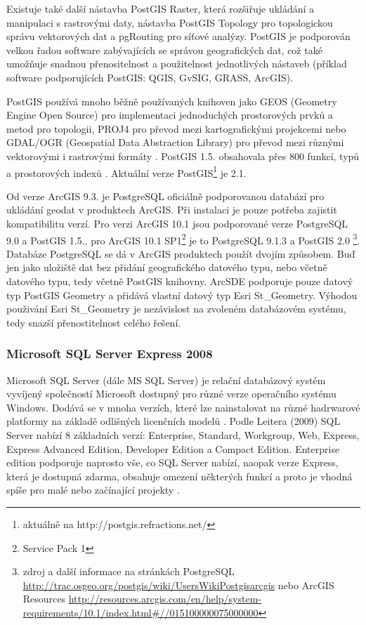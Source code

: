 Existuje také další nástavba PostGIS Raster, která rozšiřuje ukládání a manipulaci s rastrovými daty, nástavba PostGIS Topology pro topologickou správu vektorových dat a pgRouting pro síťové analýzy. PostGIS je podporován velkou řadou software zabývajících se správou geografických dat, což také umožňuje snadnou přenositelnost a použitelnost jednotlivých nástaveb (příklad software podporujících PostGIS: QGIS, GvSIG, GRASS, ArcGIS).

PostGIS používá mnoho běžně používaných knihoven jako GEOS (Geometry Engine Open Source) pro implementaci jednoduchých prostorových prvků a metod pro topologii, PROJ4 pro převod mezi kartografickými projekcemi nebo GDAL/OGR (Geospatial Data Abstraction Library) pro převod mezi různými vektorovými i rastrovými formáty \citep{ObeHsu2011}. PostGIS 1.5. obsahovala přes 800 funkcí, typů a prostorových indexů \citep{ObeHsu2012}. Aktuální verze PostGIS\footnote{aktuálně na http://postgis.refractions.net/} je 2.1.

Od verze ArcGIS 9.3. je PostgreSQL oficiálně podporovanou databází pro ukládání geodat v produktech ArcGIS. Při instalaci je pouze potřeba zajistit kompatibilitu verzí. Pro verzi ArcGIS 10.1 jsou podporované verze PostgreSQL 9.0 a PostGIS 1.5., pro ArcGIS 10.1 SP1\footnote{Service Pack 1} je to PostgreSQL 9.1.3 a PostGIS 2.0 \citep{OSGEO2013}\footnote{zdroj a další informace na stránkách PostgreSQL \url{http://trac.osgeo.org/postgis/wiki/UsersWikiPostgisarcgis} nebo ArcGIS Resources \url{http://resources.arcgis.com/en/help/system-requirements/10.1/index.html\#//015100000075000000}}. Databáze PostgreSQL se dá v ArcGIS produktech použít dvojím způsobem. Buď jen jako uložiště dat bez přidání geografického datového typu, nebo včetně datového typu, tedy včetně PostGIS knihovny. ArcSDE podporuje pouze datový typ PostGIS Geometry a přidává vlastní datový typ Esri St\_Geometry. Výhodou použivání Esri St\_Geometry je nezávislost na zvoleném databázovém systému, tedy snazší přenostitelnost celého řešení.

        \subsubsection{Microsoft SQL Server Express 2008}
        \label{MSSQL}

        Microsoft SQL Server (dále MS SQL Server) je relační databázový systém vyvíjený společností Microsoft dostupný pro různé verze operačního systému Windows. Dodává se v mnoha verzích, které lze nainstalovat na různé hadrwarové platformy na základě odlišných licenčních modelů \citep{Whalen2008}. Podle Leitera (2009) SQL Server nabízí 8 základních verzí: Enterprise, Standard, Workgroup, Web, Express, Express Advanced Edition, Developer Edition a Compact Edition. Enterprise edition podporuje naprosto vše, co SQL Server nabízí, naopak verze Express, která je dostupná zdarma, obsahuje omezení některých funkcí a proto je vhodná spíše pro malé nebo začínající projekty \citep{Leiter2009}.

